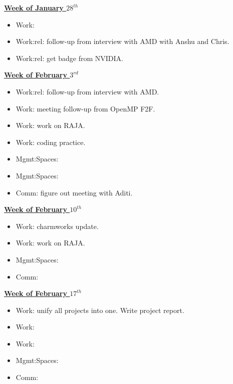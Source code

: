 \begin{multicols}{2}
\underline{\bf Week of January $28^{th}$}
\begin{framed}
\begin{itemize}
\tiny \item \tiny Work: 
\item \tiny Work:rel: follow-up from interview with AMD with Anshu and Chris. 
\item \tiny Work:rel: get badge from NVIDIA. 
\end{itemize}
\end{framed}

\underline{\bf Week of February $3^{rd}$}\\
\begin{framed}
\begin{itemize}
\tiny \item \tiny Work:rel: follow-up from interview with AMD. 

\tiny \item \tiny Work: meeting follow-up from OpenMP F2F. 
\item \tiny Work: work on RAJA. 
\item \tiny Work: coding practice.

\item \tiny Mgmt:Spaces:
\item \tiny Mgmt:Spaces:
\item \tiny Comm: figure out meeting with Aditi. 
\end{itemize}
\end{framed}

\underline{\bf Week of February $10^{th}$}\\
\begin{framed}
\begin{itemize}
\tiny \item \tiny Work: charmworks update. 
\item \tiny Work: work on RAJA. 
\item \tiny Mgmt:Spaces:
\item \tiny Comm: 
\end{itemize}
\end{framed}

\underline{\bf Week of February $17^{th}$}
\begin{framed}
\begin{itemize}
\tiny \item \tiny Work: unify all projects into one. Write project report. 
\item \tiny Work:
\item \tiny Work:
\item \tiny Mgmt:Spaces:
\item \tiny Comm:
\end{itemize}
\end{framed}
\end{multicols}
